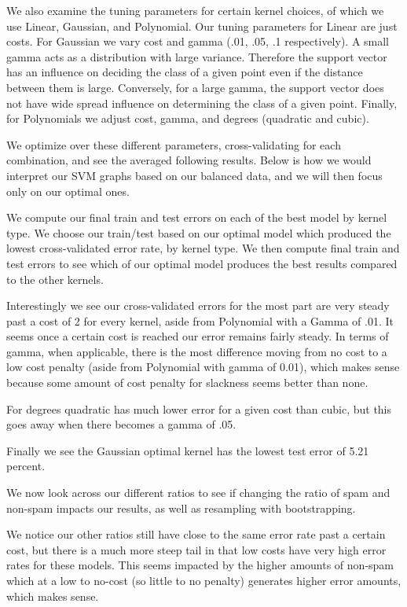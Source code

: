 \documentclass[10pt,a4paper, hidelinks]{article} %
\begin{document}
We also examine the tuning parameters for certain kernel choices, of which we use Linear, Gaussian, and Polynomial. Our tuning parameters for Linear are just costs. For Gaussian we vary cost and gamma (.01, .05, .1 respectively). A small gamma acts as a distribution with large variance. Therefore the support vector has an influence on deciding the class of a given point even if the distance between them is large. Conversely, for a large gamma, the support vector does not have wide spread influence on determining the class of a given point. Finally, for Polynomials we adjust cost, gamma, and degrees (quadratic and cubic). 

We optimize over these different parameters, cross-validating for each combination, and see the averaged following results. Below is how we would interpret our SVM graphs based on our balanced data, and we will then focus only on our optimal ones. 

We compute our final train and test errors on each of the best model by kernel type.  We choose our train/test based on our optimal model which produced the lowest cross-validated error rate, by kernel type. We then compute final train and test errors to see which of our optimal model produces the best results compared to the other kernels. 

Interestingly we see our cross-validated errors for the most part are very steady past a cost of 2 for every kernel, aside from Polynomial with a Gamma of .01. It seems once a certain cost is reached our error remains fairly steady. In terms of gamma, when applicable, there is the most difference moving from no cost to a low cost penalty (aside from Polynomial with gamma of 0.01), which makes sense because some amount of cost penalty for slackness seems better than none. 

For degrees quadratic has much lower error for a given cost than cubic, but this goes away when there becomes a gamma of .05. 

Finally we see the Gaussian optimal kernel has the lowest test error of 5.21 percent. 

We now look across our different ratios to see if changing the ratio of spam and non-spam impacts our results, as well as resampling with bootstrapping. 

We notice our other ratios still have close to the same error rate past a certain cost, but there is a much more steep tail in that low costs have very high error rates for these models. This seems impacted by the higher amounts of non-spam which at a low to no-cost (so little to no penalty) generates higher error amounts, which makes sense. 
\end{document}
